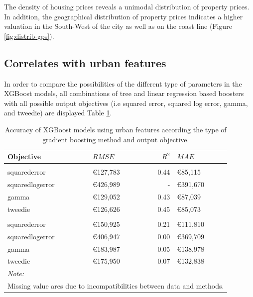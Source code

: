 \documentclass[conference,final,]{IEEEtran}
\begin{document}
The density of housing prices reveals a unimodal distribution of property prices. In addition, the geographical distribution of property prices indicates a higher valuation in the South-West of the city as well as on the coast line (Figure \ref{fig:distrib-gps}).

\hypertarget{correlates-with-urban-features}{%
\subsection{Correlates with urban features}\label{correlates-with-urban-features}}

In order to compare the possibilities of the different type of parameters in the XGBoost models,
all combinations of tree and linear regression based boosters with all possible output objectives (i.e squared error, squared log error, gamma, and tweedie) are displayed Table \ref{tab:osm-model-comparison}.

\begin{table}[H]

\caption{\label{tab:osm-model-comparison}Accuracy of XGBoost models using urban features according the type of gradient boosting method and output objective.}
\centering
\fontsize{8}{10}\selectfont
\begin{tabular}[t]{llrl}
\toprule
Objective & $RMSE$ & $R^2$ & $MAE$\\
\midrule
\addlinespace[0.3em]
\multicolumn{4}{l}{\textbf{Tree based}}\\
\hspace{1em}squarederror & €127,783 & 0.44 & €85,115\\
\hspace{1em}squaredlogerror & €426,989 & - & €391,670\\
\hspace{1em}gamma & €129,052 & 0.43 & €87,039\\
\hspace{1em}tweedie & €126,626 & 0.45 & €85,073\\
\addlinespace[0.3em]
\multicolumn{4}{l}{\textbf{Linear regression based}}\\
\hspace{1em}squarederror & €150,925 & 0.21 & €111,810\\
\hspace{1em}squaredlogerror & €406,947 & 0.00 & €369,709\\
\hspace{1em}gamma & €183,987 & 0.05 & €138,978\\
\hspace{1em}tweedie & €175,950 & 0.07 & €132,838\\
\bottomrule
\multicolumn{4}{l}{\textit{Note: }}\\
\multicolumn{4}{l}{Missing value ares due to incompatibilities between data and methods.}\\
\end{tabular}
\end{table}
\end{document}
